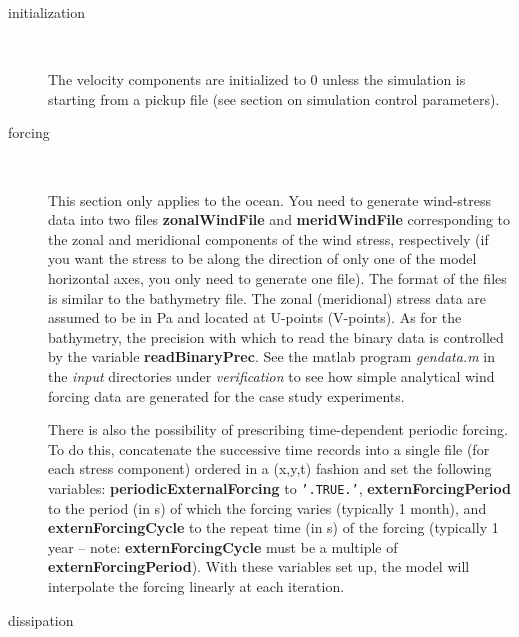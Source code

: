 \begin{description}
\item[initialization] \ 
  
  The velocity components are initialized to 0 unless the simulation
  is starting from a pickup file (see section on simulation control
  parameters).

\item[forcing] \ 
  
  This section only applies to the ocean. You need to generate
  wind-stress data into two files \textbf{zonalWindFile} and
  \textbf{meridWindFile} corresponding to the zonal and meridional
  components of the wind stress, respectively (if you want the stress
  to be along the direction of only one of the model horizontal axes,
  you only need to generate one file). The format of the files is
  similar to the bathymetry file. The zonal (meridional) stress data
  are assumed to be in Pa and located at U-points (V-points). As for
  the bathymetry, the precision with which to read the binary data is
  controlled by the variable \textbf{readBinaryPrec}.  See the matlab
  program \textit{gendata.m} in the \textit{input} directories under
  \textit{verification} to see how simple analytical wind forcing data
  are generated for the case study experiments.
  
  There is also the possibility of prescribing time-dependent periodic
  forcing. To do this, concatenate the successive time records into a
  single file (for each stress component) ordered in a (x,y,t) fashion
  and set the following variables: \textbf{periodicExternalForcing }to
  \texttt{'.TRUE.'}, \textbf{externForcingPeriod }to the period (in s)
  of which the forcing varies (typically 1 month), and
  \textbf{externForcingCycle} to the repeat time (in s) of the forcing
  (typically 1 year -- note: \textbf{ externForcingCycle} must be a
  multiple of \textbf{externForcingPeriod}).  With these variables set
  up, the model will interpolate the forcing linearly at each
  iteration.

\item[dissipation] \ 
  

\end{description}
